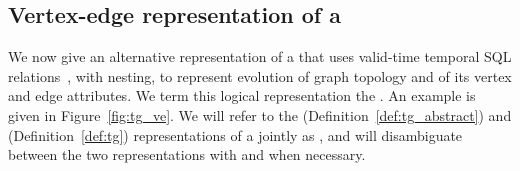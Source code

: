 \subsection{Vertex-edge representation of a \tg}
\label{sec:model:ve}

We now give an alternative representation of a \tg that uses
valid-time temporal SQL relations~\cite{DBLP:conf/vldb/BohlenSS96},
with nesting, to represent evolution of graph topology and of its
vertex and edge attributes.  We term this logical representation the
{\em \ve \tg}.  An example is given in
Figure~\ref{fig:tg_ve}.  We will refer to the \rgs
(Definition~\ref{def:tg_abstract}) and \ve (Definition~\ref{def:tg})
representations of a \tg jointly as , and will disambiguate
between the two representations with \trg and \tve when necessary.


